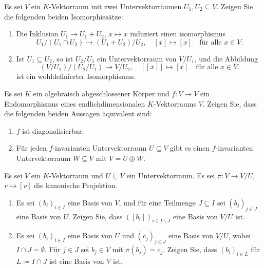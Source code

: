 \documentclass[a4paper,10pt]{scrartcl}
\begin{document}
\begin{question}
  Es sei $V$ ein $K$-Vektorraum mit zwei Untervektorräumen $U_1, U_2 \subseteq V$.
  Zeigen Sie die folgenden beiden Isomorphiesätze:
  \begin{enumerate}[leftmargin=*]
    \item
      Die Inklusion $U_1 \to U_1 + U_2$, $x \mapsto x$ induziert einen isomorphismus
      \[
        U_1 / (U_1 \cap U_2) \to (U_1 + U_2) / U_2,
        \quad
        [x] \mapsto [x]
        \quad
        \text{für alle $x \in V$}.
      \]
    \item
      Ist $U_1 \subseteq U_2$, so ist $U_2 / U_1$ ein Untervektorraum von $V / U_1$, und die Abbildung
      \[
        (V / U_1) / (U_2 / U_1) \to V / U_2,
        \quad
        [[x]] \mapsto [x]
        \quad
        \text{für alle $x \in V$}.
      \]
      ist ein wohldefinierter Isomorphismus.
  \end{enumerate}
\end{question}



\begin{question}
  Es sei $K$ ein algebraisch abgeschlossener Körper und $f \colon V \to V$ ein Endomorphismus eines endlichdimensionalen $K$-Vektorraums $V$.
  Zeigen Sie, dass die folgenden beiden Aussagen äquivalent sind:
  \begin{enumerate}
    \item
      $f$ ist diagonalisierbar.
    \item
      Für jeden $f$-invarianten Untervektorraum $U \subseteq V$ gibt es einen $f$-invarianten Untervektorraum $W \subseteq V$ mit $V = U \oplus W$.
  \end{enumerate}
\end{question}


\begin{question}
  Es sei $V$ ein $K$-Vektorraum und $U \subseteq V$ ein Untervektorraum.
  Es sei $\pi \colon V \to V/U$, $v \mapsto [v]$ die kanonische Projektion.
  \begin{enumerate}[leftmargin=*]
    \item
      Es sei $(b_i)_{i \in I}$ eine Basis von $V$, und für eine Teilmenge $J \subseteq I$ sei $(b_j)_{j \in J}$ eine Basis von $U$.
      Zeigen Sie, dass $([b_i])_{i \in I \smallsetminus J}$ eine Basis von $V/U$ ist.
    \item
      Es sei $(b_i)_{i \in I}$ eine Basis von $U$ und $(c_j)_{j \in J}$ eine Basis von $V/U$, wobei $I \cap J = \emptyset$.
      Für $j \in J$ sei $b_j \in V$ mit $\pi(b_j) = c_j$.
      Zeigen Sie, dass $(b_l)_{l \in L}$ für $L \coloneqq I \cap J$ ist eine Basis von $V$ ist.
  \end{enumerate}
\end{question}
\end{document}
